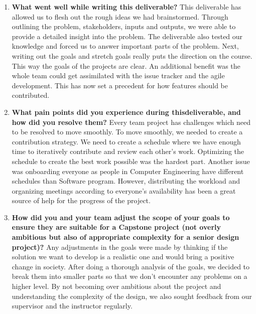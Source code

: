 \documentclass{article}
\begin{document}



\begin{enumerate}
    \item \textbf{What went well while writing this deliverable?}
    This deliverable has allowed us to flesh out the rough ideas we had brainstormed. Through outlining the problem, stakeholders, inputs and outputs, we were able to provide a detailed insight into the problem. The deliverable also tested our knowledge and forced us to answer important parts of the problem.
    Next, writing out the goals and stretch goals really puts the direction on the course. This way the goals of the projects are clear.
    An additional benefit was the whole team could get assimilated with the issue tracker and the agile development. This has now set a precedent for how features should be contributed.

    \item \textbf{What pain points did you experience during thisdeliverable, and how did you resolve them?}
    Every team project has challenges which need to be resolved to move smoothly. To move smoothly, we needed to create a contribution strategy. We need to create a schedule where we have enough time to iteratively contribute and review each other’s work. Optimizing the schedule to create the best work possible was the hardest part. 
    Another issue was onboarding everyone as people in Computer Engineering have different schedules than Software program. However, distributing the workload and organizing meetings according to everyone’s availability has been a great source of help for the progress of the project.  

    \item \textbf{How did you and your team adjust the scope of your goals to ensure they are suitable for a Capstone project (not overly ambitious but also of appropriate complexity for a senior design project)?}
    Any adjustments in the goals were made by thinking if the solution we want to develop is a realistic one and would bring a positive change in society. After doing a thorough analysis of the goals, we decided to break them into smaller parts so that we don’t encounter any problems on a higher level. By not becoming over ambitious about the project and understanding the complexity of the design, we also sought feedback from our supervisor and the instructor regularly.
\end{enumerate}  
\end{document}
